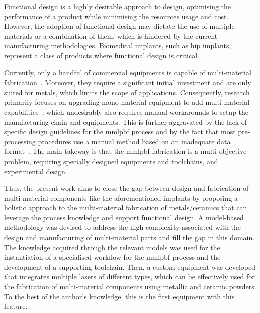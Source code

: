 
%
%
Functional design is a highly desirable approach to design, optimising the
performance of a product while minimising the resources usage and
cost.
However, the adoption of functional design may dictate the use of multiple
materials or a combination of them, which is hindered by the current manufacturing methodologies. Biomedical implants, such as hip implants, represent a class of products where functional design is critical.

Currently, only a handful of commercial equipments is capable of multi-material
fabrication~\cite{aconityMIDI, slm280}. 
Moreover, they require a significant
initial investment and are only suited for metals, which limits the scope of
applications.
Consequently, research primarily focuses on upgrading mono-material equipment to
add multi-material capabilities~\cite{bareth2022Implem, schneck2022capability,
  nadimpali2019MMSteels, anstaett2017fabrication, sing2015interfacial,
  liu2014interfacial},  which undesirably also requires manual workarounds to
setup the manufacturing chain and equipments.
This is further aggravated by the lack of specific design guidelines for the 
\gls{mmlpbf} process and by the fact that most pre-processing procedures use a
manual method based on an inadequate data format~\cite{schneck2021review}.
%
The main takeway is that the \gls{mmlpbf} fabrication is a multi-objective
problem, requiring specially designed equipments and toolchains, and
experimental design.

Thus, the present work aims to close the gap between design and fabrication of
multi-material components like the aforementioned implants by proposing a holistic
approach to the multi-material fabrication of metals/ceramics that can leverage
the process knowledge and support functional design. A model-based methodology
was devised to address the high complexity associated with the design and manufacturing of multi-material parts and fill the
gap in this domain. 
The knowledge acquired through the relevant models was used for the
instantiation of a specialised workflow for the \gls{mmlpbf} process and the
development of a supporting toolchain. Then, a custom equipment was developed that
integrates multiple lasers
of different types, which can be effectively used for the fabrication of
multi-material components using metallic and ceramic powders. To the best of the
author's knowledge, this is the first equipment with this feature.

